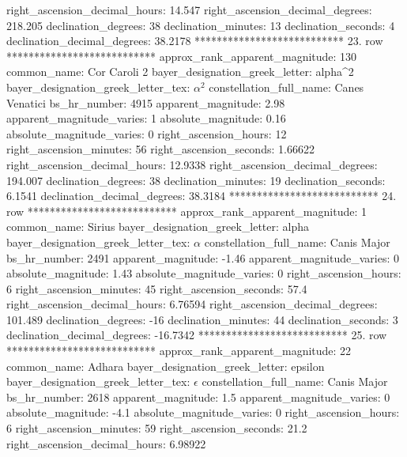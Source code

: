      right_ascension_decimal_hours: 14.547
   right_ascension_decimal_degrees: 218.205
               declination_degrees: 38
               declination_minutes: 13
               declination_seconds: 4
       declination_decimal_degrees: 38.2178
*************************** 23. row ***************************
    approx_rank_apparent_magnitude: 130
                       common_name: Cor Caroli 2
    bayer_designation_greek_letter: alpha^2
bayer_designation_greek_letter_tex: $\alpha^2$
           constellation_full_name: Canes Venatici
                      bs_hr_number: 4915
                apparent_magnitude: 2.98
         apparent_magnitude_varies: 1
                absolute_magnitude: 0.16
         absolute_magnitude_varies: 0
             right_ascension_hours: 12
           right_ascension_minutes: 56
           right_ascension_seconds: 1.66622
     right_ascension_decimal_hours: 12.9338
   right_ascension_decimal_degrees: 194.007
               declination_degrees: 38
               declination_minutes: 19
               declination_seconds: 6.1541
       declination_decimal_degrees: 38.3184
*************************** 24. row ***************************
    approx_rank_apparent_magnitude: 1
                       common_name: Sirius
    bayer_designation_greek_letter: alpha
bayer_designation_greek_letter_tex: $\alpha$
           constellation_full_name: Canis Major
                      bs_hr_number: 2491
                apparent_magnitude: -1.46
         apparent_magnitude_varies: 0
                absolute_magnitude: 1.43
         absolute_magnitude_varies: 0
             right_ascension_hours: 6
           right_ascension_minutes: 45
           right_ascension_seconds: 57.4
     right_ascension_decimal_hours: 6.76594
   right_ascension_decimal_degrees: 101.489
               declination_degrees: -16
               declination_minutes: 44
               declination_seconds: 3
       declination_decimal_degrees: -16.7342
*************************** 25. row ***************************
    approx_rank_apparent_magnitude: 22
                       common_name: Adhara
    bayer_designation_greek_letter: epsilon
bayer_designation_greek_letter_tex: $\epsilon$
           constellation_full_name: Canis Major
                      bs_hr_number: 2618
                apparent_magnitude: 1.5
         apparent_magnitude_varies: 0
                absolute_magnitude: -4.1
         absolute_magnitude_varies: 0
             right_ascension_hours: 6
           right_ascension_minutes: 59
           right_ascension_seconds: 21.2
     right_ascension_decimal_hours: 6.98922
